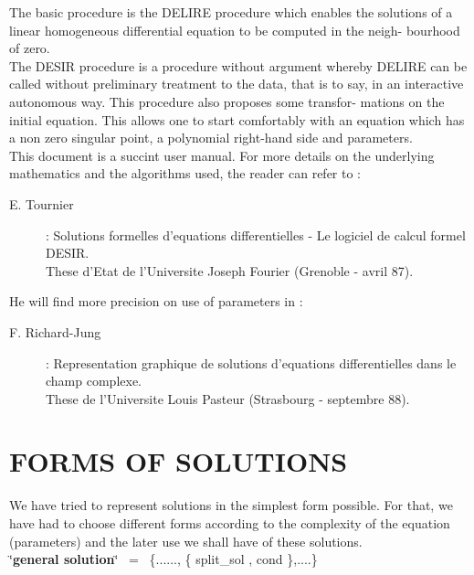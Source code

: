 \documentclass[a4paper]{article}
\begin{document}
The basic procedure is the DELIRE procedure which enables the solutions of
a linear homogeneous differential equation to be computed in the neigh-
bourhood of zero. \\

The DESIR procedure is a procedure without argument whereby DELIRE can be
called without preliminary treatment to the data, that is to say, in an
interactive autonomous way. This procedure also proposes some transfor-
mations on the initial equation. This allows one to start comfortably
with an equation which has a non zero singular point, a polynomial
right-hand side and parameters. \\
This document is a succint user manual. For more details on the underlying
mathematics and the algorithms used, the reader can refer to : \\
\begin{center}
\begin{description}
\item[E. Tournier] : Solutions formelles d'equations differentielles - Le
logiciel de calcul formel DESIR. \\
These d'Etat de l'Universite Joseph Fourier (Grenoble - avril 87).
\end{description}
\end{center}

He will find more precision on use of parameters in :
\begin{center}
\begin{description}
\item[F. Richard-Jung] : Representation graphique de solutions d'equations
differentielles dans le champ complexe. \\
These de l'Universite Louis Pasteur (Strasbourg - septembre 88).
\end{description}
\end{center}

\section{FORMS OF SOLUTIONS}
We have tried to represent solutions in the simplest form possible. For
that, we have had to choose different forms according to the complexity
of the equation (parameters) and the later use we shall have of these
solutions. \\

\char`\"{}{\bf general solution}\char`\"{}~ =~ \{......, \{ split\_sol , cond \},....\} \\
\end{document}
